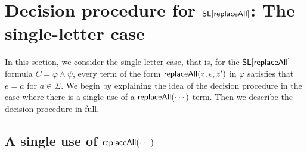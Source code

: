 

\section{Decision procedure for $\mathsf{SL}[\mathsf{replaceAll}]$: The single-letter case} \label{sec:replaceallsl}








In this section, we consider the single-letter case, that is, for the $\mathsf{SL}[\mathsf{replaceAll}]$ formula $C = \varphi \wedge \psi$, every term of the form $\mathsf{replaceAll}(z, e, z')$ in $\varphi$ satisfies that $e=a$ for $a \in \Sigma$.
We begin by explaining the idea of the decision procedure in the case where there is a single use of a $\mathsf{replaceAll}(\cdots)$ term.
Then we describe the decision procedure in full.



\subsection{A single use of $\mathsf{replaceAll}(\cdots)$}


